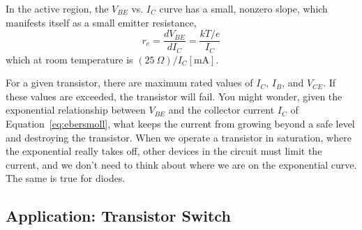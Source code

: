 \documentclass[11pt]{article}
\begin{document}
In the active region, the $V_{BE}$ vs. $I_C$ curve has a small,
nonzero slope, which manifests itself as a small emitter resistance,
\begin{equation}
  r_e = \frac{d V_{BE}}{d I_C} = \frac{kT/e}{I_C}
\label{eq:emitterresistance}
\end{equation}
which at room temperature is $(25~\Omega)/I_C[\mathrm{mA}]$.

For a given transistor, there are maximum rated values of $I_C$,
$I_B$, and $V_{CE}$. If these values are exceeded, the transistor will
fail. You might wonder, given the exponential relationship between
$V_{BE}$ and the collector current $I_C$ of
Equation~\ref{eq:ebersmoll}, what keeps the current from growing
beyond a safe level and destroying the transistor. When we operate a
transistor in saturation, where the exponential really takes off,
other devices in the circuit must limit the current, and we don't need
to think about where we are on the exponential curve. The same is true
for diodes.

\vspace{12 pt}
\noindent
{}

\subsection{Application: Transistor Switch}
\label{sec:transistorswitch}
\end{document}
